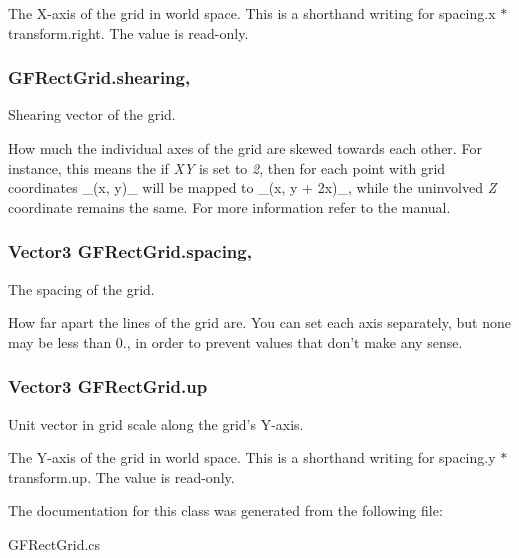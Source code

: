 The X-\/axis of the grid in world space. This is a shorthand writing for {\ttfamily spacing.\+x $\ast$ transform.\+right}. The value is read-\/only. \hypertarget{class_g_f_rect_grid_af0534ff36d0058a2b00ea898c9ceadf6_af0534ff36d0058a2b00ea898c9ceadf6}{
\subsubsection[{shearing}]{ G\+F\+Rect\+Grid.\+shearing\hspace{0.3cm}{\ttfamily [get]}, {\ttfamily [set]}}}\label{class_g_f_rect_grid_af0534ff36d0058a2b00ea898c9ceadf6_af0534ff36d0058a2b00ea898c9ceadf6}
Shearing vector of the grid.

How much the individual axes of the grid are skewed towards each other. For instance, this means the if {\itshape X\+Y} is set to {\itshape 2}, then for each point with grid coordinates \+\_\+(x, y)\+\_\+ will be mapped to \+\_\+(x, y + 2x)\+\_\+, while the uninvolved {\itshape Z} coordinate remains the same. For more information refer to the manual. \hypertarget{class_g_f_rect_grid_a149aa6bd8f08def54ce1b9dd843b6421_a149aa6bd8f08def54ce1b9dd843b6421}{
\subsubsection[{spacing}]{\setlength{\rightskip}{0pt plus 5cm}Vector3 G\+F\+Rect\+Grid.\+spacing\hspace{0.3cm}{\ttfamily [get]}, {\ttfamily [set]}}}\label{class_g_f_rect_grid_a149aa6bd8f08def54ce1b9dd843b6421_a149aa6bd8f08def54ce1b9dd843b6421}
The spacing of the grid.

How far apart the lines of the grid are. You can set each axis separately, but none may be less than 0., in order to prevent values that don't make any sense. \hypertarget{class_g_f_rect_grid_a4e395afadccb994ea1faff1bdf9d7416_a4e395afadccb994ea1faff1bdf9d7416}{
\subsubsection[{up}]{\setlength{\rightskip}{0pt plus 5cm}Vector3 G\+F\+Rect\+Grid.\+up\hspace{0.3cm}{\ttfamily [get]}}}\label{class_g_f_rect_grid_a4e395afadccb994ea1faff1bdf9d7416_a4e395afadccb994ea1faff1bdf9d7416}
Unit vector in grid scale along the grid's Y-\/axis.

The Y-\/axis of the grid in world space. This is a shorthand writing for {\ttfamily spacing.\+y $\ast$ transform.\+up}. The value is read-\/only. 

The documentation for this class was generated from the following file\+:\begin{DoxyCompactItemize}
\item 
G\+F\+Rect\+Grid.\+cs\end{DoxyCompactItemize}
